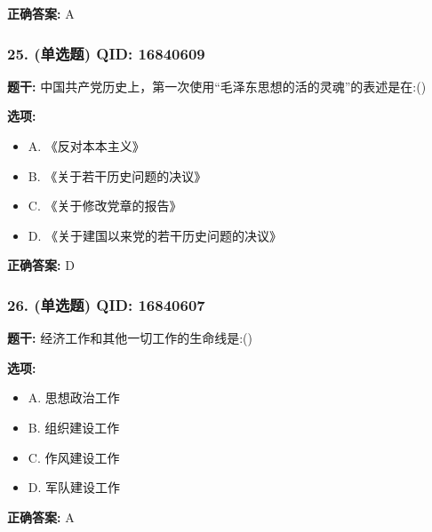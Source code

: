 \documentclass[12pt,UTF8]{ctexart}
\begin{document}
\textbf{正确答案:}
A

\vspace{0.3em}\hrulefill\vspace{0.7em}

\subsubsection*{25. (单选题) \small QID: 16840609}

\textbf{题干:}
中国共产党历史上，第一次使用“毛泽东思想的活的灵魂”的表述是在:()

\textbf{选项:}
\begin{itemize}[leftmargin=*]

  \item A. 《反对本本主义》

  \item B. 《关于若干历史问题的决议》

  \item C. 《关于修改党章的报告》

  \item D. 《关于建国以来党的若干历史问题的决议》

\end{itemize}

\textbf{正确答案:}
D

\vspace{0.3em}\hrulefill\vspace{0.7em}

\subsubsection*{26. (单选题) \small QID: 16840607}

\textbf{题干:}
经济工作和其他一切工作的生命线是:()

\textbf{选项:}
\begin{itemize}[leftmargin=*]

  \item A. 思想政治工作

  \item B. 组织建设工作

  \item C. 作风建设工作

  \item D. 军队建设工作

\end{itemize}

\textbf{正确答案:}
A

\vspace{0.3em}\hrulefill\vspace{0.7em}
\end{document}
